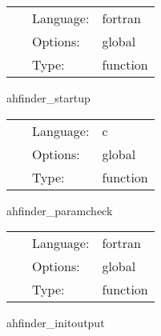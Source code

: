  \begin{tabular*}{160mm}{cll} 
~ & Language:  & fortran \\ 
~ & Options:  & global \\ 
~ & Type:  & function \\ 
\end{tabular*} 


\vspace{5mm}


\hspace{5mm} ahfinder\_startup 

\hspace{5mm}{\it register ahfinder as an io method } 


\hspace{5mm}

 \begin{tabular*}{160mm}{cll} 
~ & Language:  & c \\ 
~ & Options:  & global \\ 
~ & Type:  & function \\ 
\end{tabular*} 


\vspace{5mm}


\hspace{5mm} ahfinder\_paramcheck 

\hspace{5mm}{\it check for physical or conformal metric } 


\hspace{5mm}

 \begin{tabular*}{160mm}{cll} 
~ & Language:  & fortran \\ 
~ & Options:  & global \\ 
~ & Type:  & function \\ 
\end{tabular*} 


\vspace{5mm}


\hspace{5mm} ahfinder\_initoutput 

\hspace{5mm}{\it create output files, write headers } 


\hspace{5mm}

